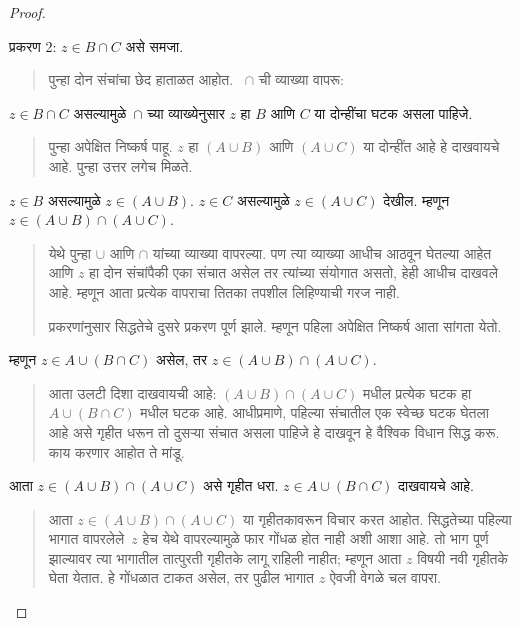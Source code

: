 \begin{proof}
\begin{quote}
\end{quote}
प्रकरण 2: $z \in B \cap C$ असे समजा.
\begin{quote}
पुन्हा दोन संचांचा छेद हाताळत आहोत. ~$ \cap$ ची व्याख्या वापरू:
\end{quote}
$z \in B \cap C$ असल्यामुळे~$\cap$ च्या व्याख्येनुसार $z$ हा $B$ आणि $C$ या दोन्हींचा घटक असला पाहिजे.
\begin{quote}
पुन्हा अपेक्षित निष्कर्ष पाहू. $z$ हा $(A \cup B)$ आणि $(A \cup C)$ या दोन्हींत आहे हे दाखवायचे आहे. पुन्हा उत्तर लगेच मिळते.
\end{quote}
$z \in B$ असल्यामुळे $z \in (A \cup B)$. $z \in C$ असल्यामुळे $z \in (A \cup C)$ देखील. म्हणून $z \in (A \cup B) \cap (A \cup C)$.
\begin{quote}
येथे पुन्हा $\cup$ आणि $\cap$ यांच्या व्याख्या वापरल्या. पण त्या व्याख्या आधीच आठवून घेतल्या आहेत आणि $z$ हा दोन संचांपैकी एका संचात असेल तर त्यांच्या संयोगात असतो, हेही आधीच दाखवले आहे. म्हणून आता प्रत्येक वापराचा तितका तपशील लिहिण्याची गरज नाही.

प्रकरणांनुसार सिद्धतेचे दुसरे प्रकरण पूर्ण झाले. म्हणून पहिला अपेक्षित निष्कर्ष आता सांगता येतो.
\end{quote}
म्हणून $z \in A \cup (B \cap C)$ असेल, तर $z \in (A \cup B) \cap (A \cup C)$.
\begin{quote}
आता उलटी दिशा दाखवायची आहे: $(A \cup B) \cap (A \cup C)$ मधील प्रत्येक घटक हा $A \cup (B \cap C)$ मधील घटक आहे. आधीप्रमाणे, पहिल्या संचातील एक स्वेच्छ घटक घेतला आहे असे गृहीत धरून तो दुसऱ्या संचात असला पाहिजे हे दाखवून हे वैश्विक विधान सिद्ध करू. काय करणार आहोत ते मांडू.
\end{quote}
आता $z \in (A \cup B) \cap (A \cup C)$ असे गृहीत धरा. $z \in A \cup (B \cap C)$ दाखवायचे आहे.
\begin{quote}
आता $z \in (A \cup B) \cap (A \cup C)$ या गृहीतकावरून विचार करत आहोत. सिद्धतेच्या पहिल्या भागात वापरलेले~$z$ हेच येथे वापरल्यामुळे फार गोंधळ होत नाही अशी आशा आहे. तो भाग पूर्ण झाल्यावर त्या भागातील तात्पुरती गृहीतके लागू राहिली नाहीत; म्हणून आता $z$ विषयी नवी गृहीतके घेता येतात. हे गोंधळात टाकत असेल, तर पुढील भागात $z$ ऐवजी वेगळे चल वापरा.


\end{quote}
\end{proof}
